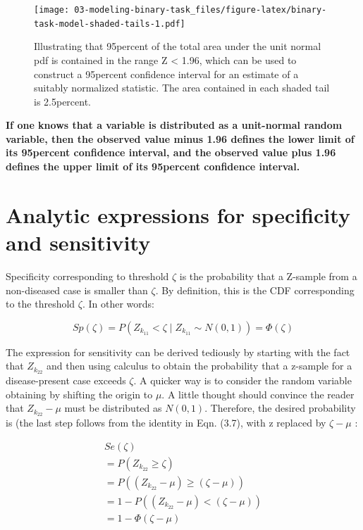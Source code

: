 \documentclass[
]{book}
\begin{document}
\begin{figure}
\centering
\texttt{[image: 03-modeling-binary-task\_files/figure-latex/binary-task-model-shaded-tails-1.pdf]}
\caption{\label{fig:binary-task-model-shaded-tails}Illustrating that 95percent of the total area under the unit normal pdf is contained in the range \textbar Z\textbar{} \textless{} 1.96, which can be used to construct a 95percent confidence interval for an estimate of a suitably normalized statistic. The area contained in each shaded tail is 2.5percent.}
\end{figure}

\textbf{If one knows that a variable is distributed as a unit-normal random variable, then the observed value minus 1.96 defines the lower limit of its 95percent confidence interval, and the observed value plus 1.96 defines the upper limit of its 95percent confidence interval.}

\hypertarget{binary-task-model-sensitivity-specificity}{%
\section{Analytic expressions for specificity and sensitivity}\label{binary-task-model-sensitivity-specificity}}

Specificity corresponding to threshold \(\zeta\) is the probability that a Z-sample from a non-diseased case is smaller than \(\zeta\). By definition, this is the CDF corresponding to the threshold \(\zeta\). In other words:

\begin{equation} 
Sp\left ( \zeta \right )=P\left ( Z_{k_11} < \zeta\mid Z_{k_11} \sim N\left ( 0,1 \right )\right ) = \Phi\left ( \zeta \right )
\label{eq:binary-task-model-Specificity}
\end{equation}

The expression for sensitivity can be derived tediously by starting with the fact that \(Z_{k_22}\) and then using calculus to obtain the probability that a z-sample for a disease-present case exceeds \(\zeta\). A quicker way is to consider the random variable obtaining by shifting the origin to \(\mu\). A little thought should convince the reader that \(Z_{k_22}-\mu\) must be distributed as \(N(0,1)\). Therefore, the desired probability is (the last step follows from the identity in Eqn. (3.7), with z replaced by \(\zeta-\mu\) :

\begin{equation}
\begin{aligned} 
Se\left ( \zeta \right )\\
=P\left ( Z_{k_22} \geq \zeta\right ) \\
=P\left (\left ( Z_{k_22} -\mu  \right ) \geq\left ( \zeta -\mu  \right )\right ) \\
=1-P\left (\left ( Z_{k_22} -\mu  \right ) < \left ( \zeta -\mu  \right )\right ) \\
= 1-\Phi\left ( \zeta -\mu \right )
\end{aligned}
\label{eq:binary-task-model-Sensitivity1}
\end{equation}
\end{document}
